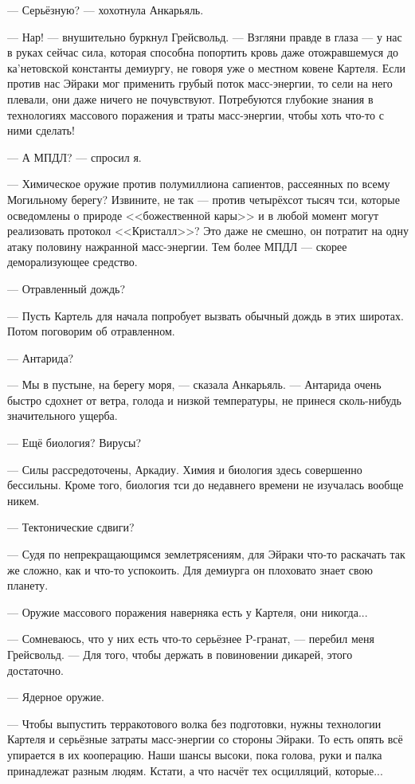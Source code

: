 --- Серьёзную? --- хохотнула Анкарьяль.

--- Нар! --- внушительно буркнул Грейсвольд.
--- Взгляни правде в глаза --- у нас в руках сейчас сила, которая способна попортить кровь даже отожравшемуся до ка'нетовской константы демиургу, не говоря уже о местном ковене Картеля.
Если против нас Эйраки мог применить грубый поток масс-энергии, то сели на него плевали, они даже ничего не почувствуют.
Потребуются глубокие знания в технологиях массового поражения и траты масс-энергии, чтобы хоть что-то с ними сделать!

--- А МПДЛ? --- спросил я.

--- Химическое оружие против полумиллиона сапиентов, рассеянных по всему Могильному берегу?
Извините, не так --- против четырёхсот тысяч тси, которые осведомлены о природе <<божественной кары>> и в любой момент могут реализовать протокол <<Кристалл>>?
Это даже не смешно, он потратит на одну атаку половину нажранной масс-энергии.
Тем более МПДЛ --- скорее деморализующее средство.

--- Отравленный дождь?

--- Пусть Картель для начала попробует вызвать обычный дождь в этих широтах.
Потом поговорим об отравленном.

--- Антарида?

--- Мы в пустыне, на берегу моря, --- сказала Анкарьяль.
--- Антарида очень быстро сдохнет от ветра, голода и низкой температуры, не принеся сколь-нибудь значительного ущерба.

--- Ещё биология?
Вирусы?

--- Силы рассредоточены, Аркадиу.
Химия и биология здесь совершенно бессильны.
Кроме того, биология тси до недавнего времени не изучалась вообще никем.

--- Тектонические сдвиги?

--- Судя по непрекращающимся землетрясениям, для Эйраки что-то раскачать так же сложно, как и что-то успокоить.
Для демиурга он плоховато знает свою планету.

--- Оружие массового поражения наверняка есть у Картеля, они никогда...

--- Сомневаюсь, что у них есть что-то серьёзнее P-гранат, --- перебил меня Грейсвольд.
--- Для того, чтобы держать в повиновении дикарей, этого достаточно.

--- Ядерное оружие.

--- Чтобы выпустить терракотового волка без подготовки, нужны технологии Картеля и серьёзные затраты масс-энергии со стороны Эйраки.
То есть опять всё упирается в их кооперацию.
Наши шансы высоки, пока голова, руки и палка принадлежат разным людям.
Кстати, а что насчёт тех осцилляций, которые...

